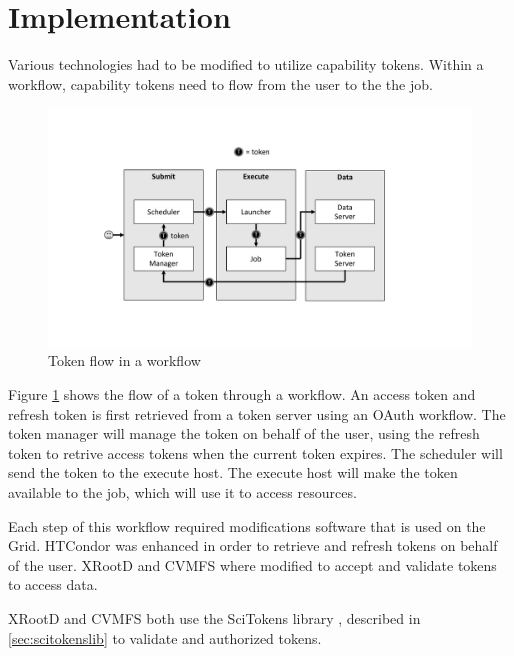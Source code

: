\documentclass{webofc}
\begin{document}
\section{Implementation}
\label{sec:implementation}

Various technologies had to be modified to utilize capability tokens.  Within a workflow, capability tokens need to flow from the user to the the job.  

\begin{figure}[ht]
\includegraphics[width=\textwidth]{images/SciTokensFlow.pdf}
\caption{Token flow in a workflow}
\label{fig:tokenflow}
\end{figure}

Figure \ref{fig:tokenflow} shows the flow of a token through a workflow.  An access token and refresh token is first retrieved from a token server using an OAuth workflow.  The token manager will manage the token on behalf of the user, using the refresh token to retrive access tokens when the current token expires.  The scheduler will send the token to the execute host.  The execute host will make the token available to the job, which will use it to access resources.

Each step of this workflow required modifications software that is used on the Grid.  HTCondor \cite{condor-practice} was enhanced in order to retrieve and refresh tokens on behalf of the user.  XRootD \cite{dorigo2005xrootd} and CVMFS \cite{buncic2010cernvm} where modified to accept and validate tokens to access data.

XRootD and CVMFS both use the SciTokens library \cite{scitokens-lib}, described in \ref{sec:scitokenslib} to validate and authorized tokens.
\end{document}
